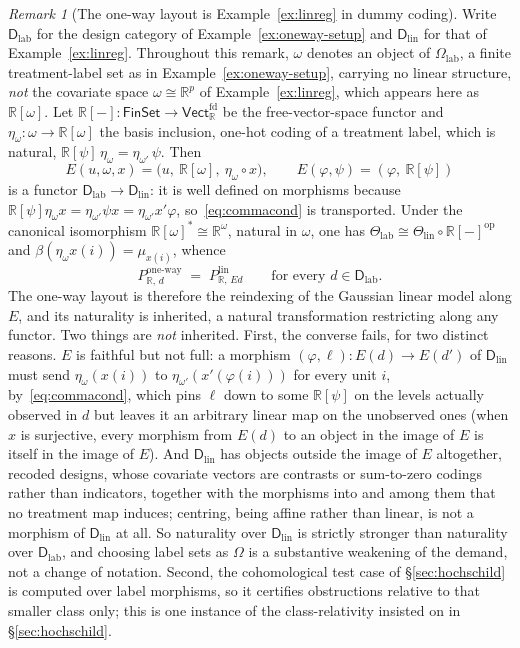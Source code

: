 \documentclass[11pt,a4paper]{article}
\theoremstyle{plain}
\theoremstyle{definition}
\theoremstyle{remark}
\newtheorem{remark}[theorem]{Remark}
\newcommand{\cat}[1]{\mathsf{#1}}
\newcommand{\catO}{\cat{\Omega}}
\newcommand{\catD}{\cat{D}}
\newcommand{\FinSet}{\cat{FinSet}}
\newcommand{\op}{\mathrm{op}}
\newcommand{\R}{\mathbb{R}}
\newcommand{\Vect}{\cat{Vect}}
\begin{document}
\begin{remark}[The one-way layout is Example~\ref{ex:linreg} in dummy
coding]\label{rem:dummy}
Write $\catD_{\mathrm{lab}}$ for the design category of
Example~\ref{ex:oneway-setup} and $\catD_{\mathrm{lin}}$ for that of
Example~\ref{ex:linreg}. Throughout this remark, $\omega$ denotes an object of
$\catO_{\mathrm{lab}}$, a finite treatment-label set as in
Example~\ref{ex:oneway-setup}, carrying no linear structure, \emph{not} the
covariate space $\omega \cong \R^{p}$ of Example~\ref{ex:linreg}, which
appears here as $\R[\omega]$.
Let $\R[-] \colon \FinSet \to \Vect_{\R}^{\mathrm{fd}}$ be the
free-vector-space functor and $\eta_{\omega} \colon \omega \to \R[\omega]$ the
basis inclusion, one-hot coding of a treatment label, which is natural,
$\R[\psi]\,\eta_{\omega} = \eta_{\omega'}\,\psi$. Then
\[
E(u,\omega,x) = \bigl(u,\ \R[\omega],\ \eta_{\omega} \circ x\bigr),
\qquad
E(\varphi,\psi) = (\varphi,\ \R[\psi])
\]
is a functor $\catD_{\mathrm{lab}} \to \catD_{\mathrm{lin}}$: it is
well defined on morphisms because $\R[\psi]\eta_{\omega}x =
\eta_{\omega'}\psi x = \eta_{\omega'}x'\varphi$, so~\eqref{eq:commacond} is
transported. Under the canonical isomorphism $\R[\omega]^{*} \cong
\R^{\omega}$, natural in $\omega$, one has $\Theta_{\mathrm{lab}} \cong
\Theta_{\mathrm{lin}} \circ \R[-]^{\op}$ and $\beta(\eta_{\omega}x(i)) = \mu_{x(i)}$, whence
\[
P^{\mathrm{one\text{-}way}}_{\R,\,d} \;=\; P^{\mathrm{lin}}_{\R,\,E d}
\qquad\text{for every } d \in \catD_{\mathrm{lab}} .
\]
The one-way layout is therefore the reindexing of the Gaussian linear model
along $E$, and its naturality is inherited, a natural transformation
restricting along any functor. Two things are \emph{not} inherited. First, the
converse fails, for two distinct reasons. $E$ is faithful but not full: a
morphism $(\varphi,\ell) \colon E(d) \to E(d')$ of $\catD_{\mathrm{lin}}$ must
send $\eta_\omega(x(i))$ to $\eta_{\omega'}(x'(\varphi(i)))$ for every unit
$i$, by~\eqref{eq:commacond}, which pins $\ell$ down to some $\R[\psi]$ on the
levels actually observed in $d$ but leaves it an arbitrary linear map on the
unobserved ones (when $x$ is surjective, every morphism from $E(d)$ to an
object in the image of $E$ is itself in the image of $E$). And
$\catD_{\mathrm{lin}}$ has objects outside the image of $E$ altogether,
recoded designs, whose covariate vectors are contrasts or sum-to-zero codings
rather than indicators, together with the morphisms into and among them
that no treatment map induces; centring, being affine rather than linear, is
not a morphism of $\catD_{\mathrm{lin}}$ at all. So
naturality over $\catD_{\mathrm{lin}}$ is strictly stronger than naturality
over $\catD_{\mathrm{lab}}$, and choosing label sets as $\catO$ is a
substantive weakening of the demand, not a change of notation. Second, the
cohomological test case of \S\ref{sec:hochschild} is computed over label
morphisms, so it certifies obstructions relative to that smaller class only;
this is one instance of the class-relativity insisted on in
\S\ref{sec:hochschild}.
\end{remark}
\end{document}

